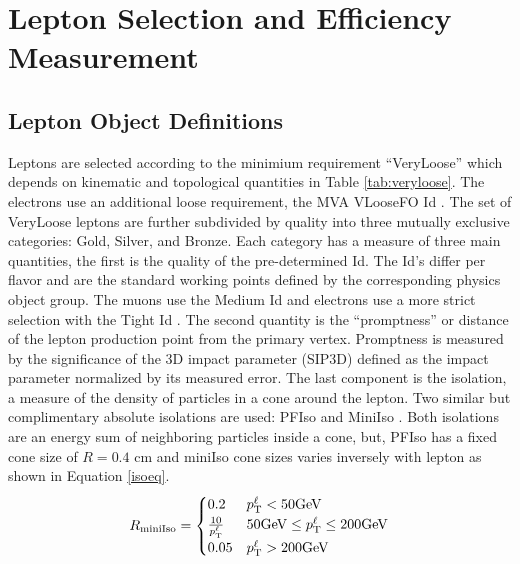 \chapter{Lepton Selection and Efficiency Measurement}

\section{Lepton Object Definitions}


Leptons are selected according to the minimium requirement ``VeryLoose'' which depends on kinematic and topological quantities in Table \ref{tab:veryloose}. The electrons use an additional loose requirement, the MVA VLooseFO Id \cite{elecMVA}. The set of VeryLoose leptons are further subdivided by quality into three mutually exclusive categories: Gold, Silver, and Bronze. Each category has a measure of three main quantities, the first is the quality of the pre-determined Id. The Id's differ per flavor and are the standard working points defined by the corresponding physics object group. The muons use the Medium Id \cite{muMediumId} and electrons use a more strict selection with the Tight Id \cite{eTightID}. The second quantity is the ``promptness'' or distance of the lepton production point from the primary vertex. Promptness is measured by the significance of the 3D impact parameter (SIP3D) defined as the impact parameter normalized by its measured error. The last component is the isolation, a measure of the density of particles in a cone around the lepton. Two similar but complimentary absolute isolations are used: PFIso \cite{murun2baseline} and MiniIso \cite{miniIso}. Both isolations are an energy sum of neighboring particles inside a cone, but, PFIso has a fixed cone size of $R=0.4$ cm  and miniIso cone sizes varies inversely with lepton \pt as shown in Equation \ref{isoeq}.
\begin{equation}
R_{\text{miniIso}}=
    \begin{cases}
      0.2 & p_{\mathrm{T}}^\ell < 50 \text{GeV}\\
      \frac{10}{p_{\mathrm{T}}^\ell} & 50 \text{GeV} \leq p_{\mathrm{T}}^\ell \leq 200 \text{GeV} \\
      0.05 & p_{\mathrm{T}}^\ell > 200 \text{GeV}
    \end{cases}
    \label{isoeq}
\end{equation}

